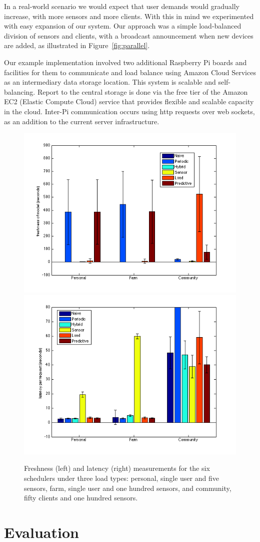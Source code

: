 \documentclass[a4paper]{acm_proc_article-sp}
\begin{document}
In a real-world scenario we would expect that user demands would gradually increase, with more sensors and more clients.  With this in mind we experimented with easy expansion of our system.  Our approach was a simple load-balanced division of sensors and clients, with a broadcast announcement when new devices are added, as illustrated in Figure~\ref{fig:parallel}.

Our example implementation involved two additional Raspberry Pi boards and facilities for them to communicate and load balance using Amazon Cloud Services as an intermediary data storage location.  This system is scalable and self-balancing.  Report to the central storage is done via the free tier of the Amazon EC2 (Elastic Compute Cloud) service that provides flexible and scalable capacity in the cloud.  Inter-Pi communication occurs using http requests over web sockets, as an addition to the current server infrastructure.

\begin{figure}
  \centering
      \includegraphics[width=0.48\linewidth]{freshness.png}
      \includegraphics[width=0.48\linewidth]{latency_for_schedulers.png}
  \caption{\label{fig:main-results}Freshness (left) and latency (right) measurements for the six schedulers under three load types: personal, single user and five sensors, farm, single user and one hundred sensors, and community, fifty clients and one hundred sensors.}
\end{figure}

\section{Evaluation}
\end{document}
